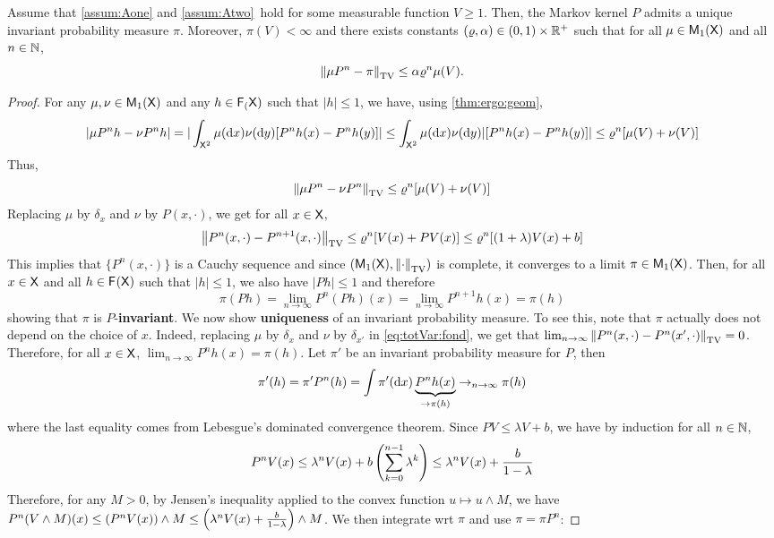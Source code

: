 \documentclass[english,graybox,envcountchap,envcountsame,sectrefs,shortlabels]{svmono}
\theoremstyle{style}
\newenvironment{svmultproof}{\small \begin{proof}}{\end{proof}}
\begin{document}
\begin{corollary} \label{cor:ergod}
Assume that \ref{assum:Aone} and \ref{assum:Atwo}\ hold for some measurable function $V\geq 1$. Then, the Markov kernel $P$ admits a unique invariant probability measure $\pi$. Moreover, $\pi(V)<\infty$ and there exists constants $(\varrho,\alpha) \in (0,1) \times \mathbb{R}^+$ such that for all $\mu\in\mathsf{M}_{1}(\mathsf{X})$ and all $n\in\mathbb{N}$,
$$
\left\|\mu P^n-\pi\right\|_{\mathrm{TV}} \leq \alpha \varrho^n \mu(V)  .
$$
\end{corollary}
\begin{svmultproof}
For any $\mu,\nu \in\mathsf{M}_{1}(\mathsf{X})$ and any $h\in\mathsf{F_{(}}\mathsf{X})$ such that $|h|\leq 1$,  we have, using \autoref{thm:ergo:geom},
$$
|\mu P^n h-\nu P^n h|=|\int_{\mathsf{X}^2}\mu(\mathrm{d} x)\nu(\mathrm{d} y) [P^nh(x)-P^nh(y)]| \leq \int_{\mathsf{X}^2}\mu(\mathrm{d} x)\nu(\mathrm{d} y)| [P^nh(x)-P^nh(y)]| \leq \varrho^n [\mu(V) +\nu(V)]
$$
Thus,
\begin{equation}\label{eq:totVar:fond}
\left\|\mu P^n -\nu P^n\right\|_{\mathrm{TV}}\leq \varrho^n [\mu(V) +\nu(V)]
\end{equation}
Replacing $\mu$ by $\delta_x$ and $\nu$ by $P(x,\cdot)$, we get for all $x\in\mathsf{X}$,
$$
\left\|P^n(x,\cdot) -P^{n+1}(x,\cdot)\right\|_{\mathrm{TV}}\leq \varrho^n [V(x) +PV(x)] \leq \varrho^n [(1+\lambda) V(x)+b]
$$
This implies that $\{P^n(x,\cdot)\}$ is a Cauchy sequence and since $(\mathsf{M}_{1}(\mathsf{X}),\left\|\cdot\right\|_{\mathrm{TV}})$ is complete, it converges to a limit $\pi \in\mathsf{M}_{1}(\mathsf{X})$. Then, for all $x\in\mathsf{X}$ and all  $h\in\mathsf{F_{}}(\mathsf{X})$ such that $|h|\leq 1$, we also have $|Ph|\leq 1$ and therefore
$$
\pi(Ph)=\lim_{n\to\infty} P^n (Ph)(x)=\lim_{n\to\infty} P^{n+1}h(x)=\pi(h)
$$
showing that $\pi$ is $P$-{\bf invariant}. We now show {\bf uniqueness} of an invariant probability measure. To see this, note that $\pi$ actually does not depend on the choice of $x$. Indeed, replacing $\mu$ by $\delta_x$ and $\nu$ by $\delta_{x'}$ in \eqref{eq:totVar:fond}, we get that $\lim_{n\to\infty}\left\|P^n(x,\cdot) -P^{n}(x',\cdot)\right\|_{\mathrm{TV}}=0$. Therefore, for all $x\in\mathsf{X}$, $\lim_{n\to\infty} P^{n}h(x)=\pi(h)$. Let $\pi'$ be an invariant probability measure for $P$, then
$$
\pi'(h)=\pi' P^n(h)=\int \pi'(\mathrm{d} x) \underbrace{P^n h(x)}_{\to \pi(h)} \rightarrow_{n\to\infty} \pi(h)
$$
where the last equality comes from Lebesgue's dominated convergence theorem. Since $PV\leq \lambda V+b$, we have by induction for all $n\in\mathbb{N}$,
$$
P^n V(x)\leq \lambda^n V(x)+b \left(\sum_{k=0}^{n-1}\lambda^k\right) \leq \lambda^n V(x)+\frac{b}{1-\lambda}
$$
Therefore, for any $M>0$, by Jensen's inequality applied to the convex function $u\mapsto u\wedge M$, we have $P^n (V\wedge M)(x) \leq ( P^n V(x))\wedge M \leq \left(\lambda^n V(x)+\frac{b}{1-\lambda}\right) \wedge M$. We then integrate wrt $\pi$ and use $\pi=\pi P^n$:

\end{svmultproof}
\end{document}
